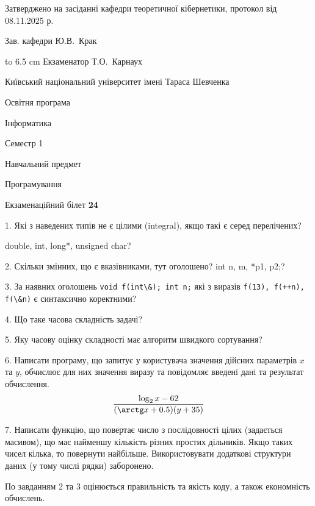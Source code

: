 \documentclass[12pt, ukrainian]{article}
\def\code#1{\Verb!#1!}
\begin{document}
{\smallskip\smallskip \begin {scriptsize} Затверджено на засіданні кафедри теоретичної кібернетики, протокол   від   08.11.2025 р.\par\smallskip\smallskip\smallskip\smallskip
{\parbox {6.5 cm} {Зав. кафедри \dotfill Ю.В.~Крак}}\hspace {0.7cm} {\hbox to 6.5 cm { Екзаменатор \dotfill Т.О.~Карнаух}} \end{scriptsize}}
\vspace{0.9cm}
{{\begin {scriptsize}\par
{ \center  Київський національний університет імені Тараса Шевченка \par}
{\parbox {5 cm}{Освітня програма \hfill}{\parbox {7 cm}{Інформатика\hfill}}\parbox {6 cm}{\hfill Семестр 1}}\par
{\parbox {5 cm} {Навчальний предмет \hfill}\parbox {7 cm}{Програмування \hfill}\parbox {6cm}{\hfill}\par}\vspace{-15pt} \end{scriptsize}}{\center Екзаменаційний білет \No \textbf { 24 }\par}}
{%
1. Які з наведених типів не є цілими (integral), якщо такі є серед перелічених?

double, int, long*, unsigned char?
\par
\vspace{2mm}
2. Скільки змінних, що є вказівниками, тут оголошено?
int n, m, *p1, p2;?
\par
\vspace{2mm}
3. За наявних оголошень \code{void f(int\&); int n;} які з виразів \code{f(13), f(++n), f(\&n)} є синтаксично коректними?
\par
\vspace{2mm}
4. Що таке часова складність задачі?
\par
\vspace{2mm}
5. Яку часову оцінку складності має алгоритм швидкого сортування?
\par
\vspace{2mm}
6. Написати програму, що запитує у користувача значення дійсних параметрів $x$ та $y$, обчислює для них значення виразу та повiдомляє введенi данi та результат обчислення.
$$\frac{\log_{2} x - 62}{(\arctg x + 0.5) (y + 35)}$$ 

\par
7. Написати функцію, що повертає число з послідовності цілих (задається масивом), що має найменшу кількість різних простих дільників. Якщо таких чисел кілька, то повернути найбільше. Використовувати додаткові структури даних (у тому числі рядки) заборонено.

По завданням 2 та 3 оцінюється правильність та якість коду, а також економність обчислень.

}
\end{document}
